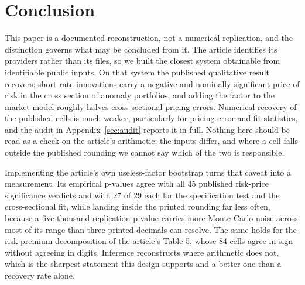 \documentclass[11pt]{article}
\begin{document}
\section{Conclusion}

This paper is a documented reconstruction, not a numerical replication, and the
distinction governs what may be concluded from it. The article identifies its
providers rather than its files, so we built the closest system obtainable from
identifiable public inputs. On that system the published qualitative result
recovers: short-rate innovations carry a negative and nominally significant
price of risk in the cross section of anomaly portfolios, and adding the factor
to the market model roughly halves cross-sectional pricing errors. Numerical
recovery of the published cells is much weaker, particularly for pricing-error
and fit statistics, and the audit in Appendix~\ref{sec:audit} reports it in
full. Nothing here should be read as a check on the article's arithmetic; the
inputs differ, and where a cell falls outside the published rounding we cannot
say which of the two is responsible.

Implementing the article's own useless-factor bootstrap turns that caveat into a
measurement. Its empirical p-values agree with all 45 published %
risk-price significance verdicts and with 27 of 29 each for the specification %
test and the cross-sectional fit, while landing inside the printed rounding far %
less often, because a five-thousand-replication p-value carries more Monte Carlo %
noise across most of its range than three printed decimals can resolve. The same
holds for the risk-premium decomposition of the article's Table 5, whose 84 cells %
agree in sign without agreeing in digits. Inference reconstructs where arithmetic %
does not, which is the sharpest statement this design supports and a better one
than a recovery rate alone.
\end{document}
